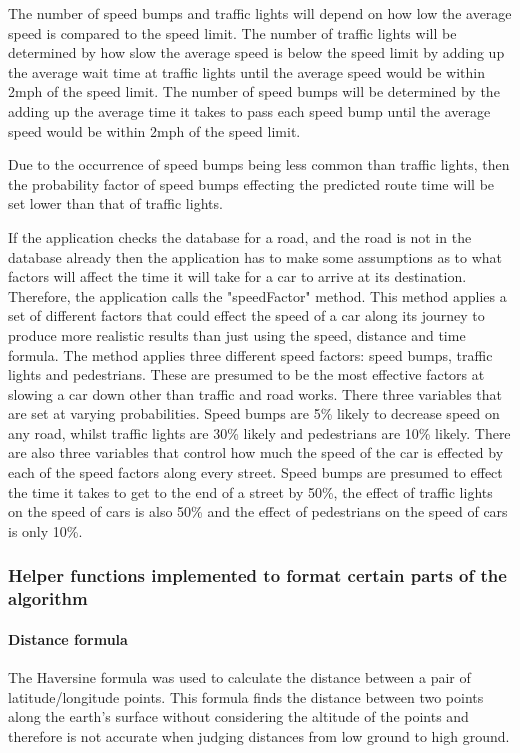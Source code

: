 \documentclass[12pt,a4paper]{article}
\begin{document}
The number of speed bumps and traffic lights will depend on how low the average speed is compared to the speed limit. The number of traffic lights will be determined by how slow the average speed is below the speed limit by adding up the average wait time at traffic lights until the average speed would be within 2mph of the speed limit. The number of speed bumps will be determined by the adding up the average time it takes to pass each speed bump until the average speed would be within 2mph of the speed limit. 

Due to the occurrence of speed bumps being less common than traffic lights, then the probability factor of speed bumps effecting the predicted route time will be set lower than that of traffic lights.

If the application checks the database for a road, and the road is not in the database already then the application has to make some assumptions as to what factors will affect the time it will take for a car to arrive at its destination. Therefore, the application calls the "speedFactor" method. This method applies a set of different factors that could effect the speed of a car along its journey to produce more realistic results than just using the speed, distance and time formula. The method applies three different speed factors: speed bumps, traffic lights and pedestrians. These are presumed to be the most effective factors at slowing a car down other than traffic and road works. There three variables that are set at varying probabilities. Speed bumps are 5\% likely to decrease speed on any road, whilst traffic lights are 30\% likely and pedestrians are 10\% likely. There are also three variables that control how much the speed of the car is effected by each of the speed factors along every street. Speed bumps are presumed to effect the time it takes to get to the end of a street by 50\%, the effect of traffic lights on the speed of cars is also 50\% and the effect of pedestrians on the speed of cars is only 10\%.

\subsubsection{Helper functions implemented to format certain parts of the algorithm}

\paragraph{Distance formula}
The Haversine formula was used to calculate the distance between a pair of latitude/longitude points. This formula finds the distance between two points along the earth's surface without considering the altitude of the points and therefore is not accurate when judging distances from low ground to high ground. 
\end{document}
